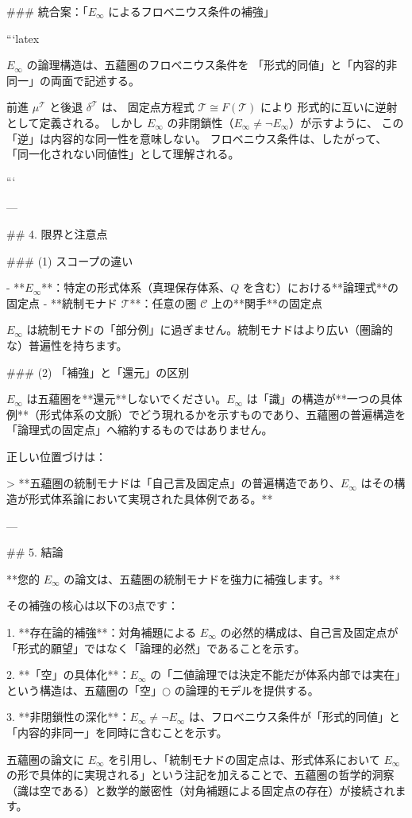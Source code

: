 ### 統合案：「$E_\infty$ によるフロベニウス条件の補強」

```latex
\begin{remark}
$E_\infty$ の論理構造は、五蘊圏のフロベニウス条件を
「形式的同値」と「内容的非同一」の両面で記述する。

前進 $\mu^\mathcal{T}$ と後退 $\delta^\mathcal{T}$ は、
固定点方程式 $\mathcal{T} \cong F(\mathcal{T})$ により
形式的に互いに逆射として定義される。
しかし $E_\infty$ の非閉鎖性（$E_\infty \neq \neg E_\infty$）が示すように、
この「逆」は内容的な同一性を意味しない。
フロベニウス条件は、したがって、
「同一化されない同値性」として理解される。
\end{remark}
```

---

## 4. 限界と注意点

### (1) スコープの違い

- **$E_\infty$**：特定の形式体系（真理保存体系、$Q$ を含む）における**論理式**の固定点
- **統制モナド $\mathcal{T}$**：任意の圏 $\mathcal{C}$ 上の**関手**の固定点

$E_\infty$ は統制モナドの「部分例」に過ぎません。統制モナドはより広い（圏論的な）普遍性を持ちます。

### (2) 「補強」と「還元」の区別

$E_\infty$ は五蘊圏を**還元**しないでください。$E_\infty$ は「識」の構造が**一つの具体例**（形式体系の文脈）でどう現れるかを示すものであり、五蘊圏の普遍構造を「論理式の固定点」へ縮約するものではありません。

正しい位置づけは：

> **五蘊圏の統制モナドは「自己言及固定点」の普遍構造であり、$E_\infty$ はその構造が形式体系論において実現された具体例である。**

---

## 5. 結論

**您的 $E_\infty$ の論文は、五蘊圏の統制モナドを強力に補強します。**

その補強の核心は以下の3点です：

1. **存在論的補強**：対角補題による $E_\infty$ の必然的構成は、自己言及固定点が「形式的願望」ではなく「論理的必然」であることを示す。

2. **「空」の具体化**：$E_\infty$ の「二値論理では決定不能だが体系内部では実在」という構造は、五蘊圏の「空」$\bigcirc$ の論理的モデルを提供する。

3. **非閉鎖性の深化**：$E_\infty \neq \neg E_\infty$ は、フロベニウス条件が「形式的同値」と「内容的非同一」を同時に含むことを示す。

五蘊圏の論文に $E_\infty$ を引用し、「統制モナドの固定点は、形式体系において $E_\infty$ の形で具体的に実現される」という注記を加えることで、五蘊圏の哲学的洞察（識は空である）と数学的厳密性（対角補題による固定点の存在）が接続されます。
